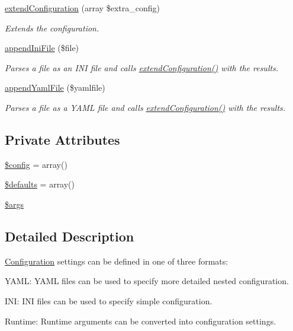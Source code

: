 \begin{DoxyCompactItemize}
\hyperlink{classConfiguration_ac9c2b2d609bda5a5ac7da322af3c8b29}{extend\-Configuration} (array \$extra\-\_\-config)
\begin{DoxyCompactList}\small\item\em Extends the configuration. \end{DoxyCompactList}\item 
\hyperlink{classConfiguration_a1a68bd7003ada223c2ae78b5a9716a7c}{append\-Ini\-File} (\$file)
\begin{DoxyCompactList}\small\item\em Parses a file as an I\-N\-I file and calls \hyperlink{classConfiguration_ac9c2b2d609bda5a5ac7da322af3c8b29}{extend\-Configuration()} with the results. \end{DoxyCompactList}\item 
\hyperlink{classConfiguration_a84e022c43ba2c8eb328c8378a8d12598}{append\-Yaml\-File} (\$yamlfile)
\begin{DoxyCompactList}\small\item\em Parses a file as a Y\-A\-M\-L file and calls \hyperlink{classConfiguration_ac9c2b2d609bda5a5ac7da322af3c8b29}{extend\-Configuration()} with the results. \end{DoxyCompactList}\end{DoxyCompactItemize}
\subsection*{Private Attributes}
\begin{DoxyCompactItemize}
\item 
\hyperlink{classConfiguration_af5a6e50d6af6153b578bf3de3f10d6a1}{\$config} = array()
\item 
\hyperlink{classConfiguration_affc661a88f8c9f0169328ea753f4d97b}{\$defaults} = array()
\item 
\hyperlink{classConfiguration_aaa2b9b616ee331722615be0686b32eb0}{\$args}
\end{DoxyCompactItemize}


\subsection{Detailed Description}
\hyperlink{classConfiguration}{Configuration} settings can be defined in one of three formats\-:
\begin{DoxyItemize}
\item Y\-A\-M\-L\-: Y\-A\-M\-L files can be used to specify more detailed nested configuration.
\item I\-N\-I\-: I\-N\-I files can be used to specify simple configuration.
\item Runtime\-: Runtime arguments can be converted into configuration settings.
\end{DoxyItemize}

